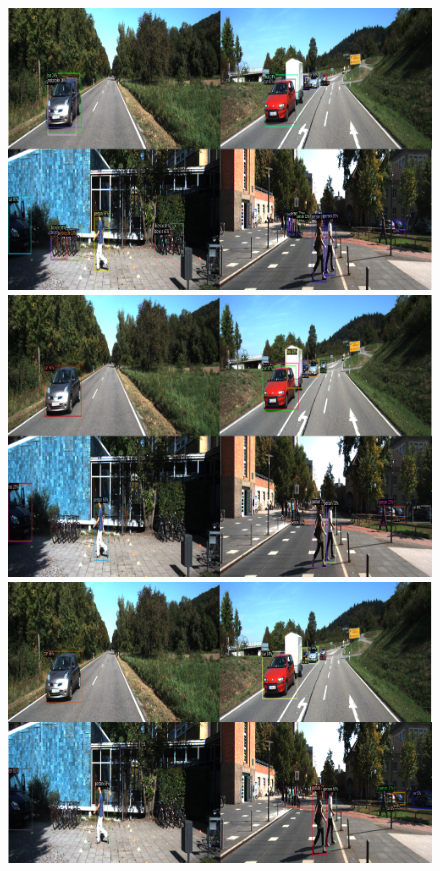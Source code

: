 \documentclass{article}
\begin{document}
\begin{figure}[h]
  \begin{minipage}{0.47\textwidth}
  \includegraphics[width=\textwidth, height=0.17\textheight]{./../../figures/1shotkitti.png}
  \subcaption{}
  \end{minipage}
  \begin{minipage}{0.47\textwidth}
  \includegraphics[width=\textwidth, height=0.17\textheight]{./../../figures/5shotkitti.png}
  \subcaption{}
  \end{minipage}
  \begin{minipage}{0.47\textwidth}
  \includegraphics[width=\textwidth, height=0.17\textheight]{./../../figures/10shotkitti.png}

\end{minipage}
\end{figure}
\end{document}
